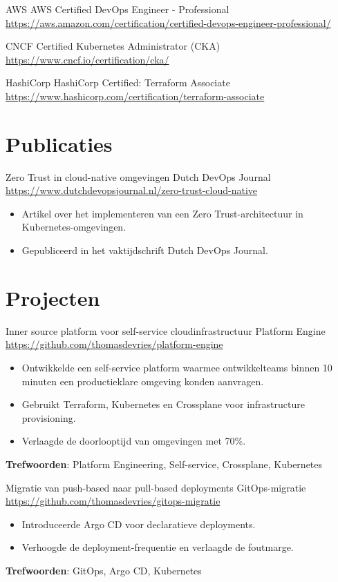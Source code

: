 \documentclass[a4paper, serif, 10pt]{moderncv}
\begin{document}
        {AWS}
        {AWS Certified DevOps Engineer - Professional}
        {\url{https://aws.amazon.com/certification/certified-devops-engineer-professional/}}
        {}
        {}

        {CNCF}
        {Certified Kubernetes Administrator (CKA)}
        {\url{https://www.cncf.io/certification/cka/}}
        {}
        {}

        {HashiCorp}
        {HashiCorp Certified: Terraform Associate}
        {\url{https://www.hashicorp.com/certification/terraform-associate}}
        {}
        {}
\section{Publicaties}

        {Zero Trust in cloud-native omgevingen}
        {Dutch DevOps Journal}
        {\url{https://www.dutchdevopsjournal.nl/zero-trust-cloud-native}}
        {}
        {\begin{itemize}
\item Artikel over het implementeren van een Zero Trust-architectuur in Kubernetes-omgevingen.
\item Gepubliceerd in het vaktijdschrift Dutch DevOps Journal.
\end{itemize}}
\section{Projecten}

        {Inner source platform voor self-service cloudinfrastructuur}
        {Platform Engine}
        {\url{https://github.com/thomasdevries/platform-engine}}
        {}
        {\begin{itemize}
\item Ontwikkelde een self-service platform waarmee ontwikkelteams binnen 10 minuten een productieklare omgeving konden aanvragen.
\item Gebruikt Terraform, Kubernetes en Crossplane voor infrastructure provisioning.
\item Verlaagde de doorlooptijd van omgevingen met 70\%.
\end{itemize}
\textbf{Trefwoorden}: Platform Engineering, Self-service, Crossplane, Kubernetes}

        {Migratie van push-based naar pull-based deployments}
        {GitOps-migratie}
        {\url{https://github.com/thomasdevries/gitops-migratie}}
        {}
        {\begin{itemize}
\item Introduceerde Argo CD voor declaratieve deployments.
\item Verhoogde de deployment-frequentie en verlaagde de foutmarge.
\end{itemize}
\textbf{Trefwoorden}: GitOps, Argo CD, Kubernetes}
\end{document}
